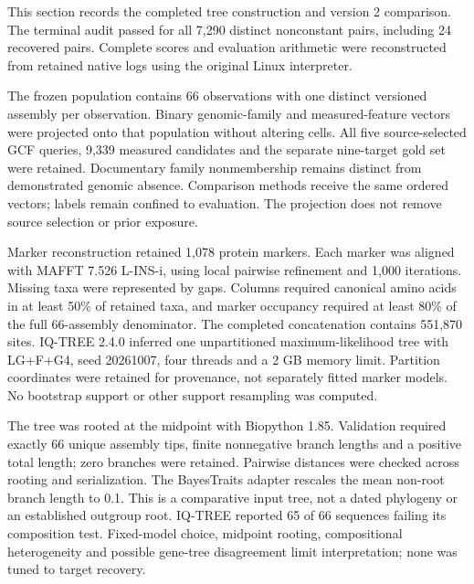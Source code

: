 \documentclass[
  10pt,
  a4paper,
]{article}
\begin{document}
This section records the completed tree construction and version 2 comparison. The terminal audit passed for all 7,290 distinct nonconstant pairs, including 24 recovered pairs. Complete scores and evaluation arithmetic were reconstructed from retained native logs using the original Linux interpreter.

The frozen population contains 66 observations with one distinct versioned assembly per observation. Binary genomic-family and measured-feature vectors were projected onto that population without altering cells. All five source-selected GCF queries, 9,339 measured candidates and the separate nine-target gold set were retained. Documentary family nonmembership remains distinct from demonstrated genomic absence. Comparison methods receive the same ordered vectors; labels remain confined to evaluation. The projection does not remove source selection or prior exposure.

Marker reconstruction retained 1,078 protein markers. Each marker was aligned with MAFFT 7.526 L-INS-i, using local pairwise refinement and 1,000 iterations. Missing taxa were represented by gaps. Columns required canonical amino acids in at least 50\% of retained taxa, and marker occupancy required at least 80\% of the full 66-assembly denominator. The completed concatenation contains 551,870 sites. IQ-TREE 2.4.0 inferred one unpartitioned maximum-likelihood tree with LG+F+G4, seed 20261007, four threads and a 2 GB memory limit. Partition coordinates were retained for provenance, not separately fitted marker models. No bootstrap support or other support resampling was computed.

The tree was rooted at the midpoint with Biopython 1.85. Validation required exactly 66 unique assembly tips, finite nonnegative branch lengths and a positive total length; zero branches were retained. Pairwise distances were checked across rooting and serialization. The BayesTraits adapter rescales the mean non-root branch length to 0.1. This is a comparative input tree, not a dated phylogeny or an established outgroup root. IQ-TREE reported 65 of 66 sequences failing its composition test. Fixed-model choice, midpoint rooting, compositional heterogeneity and possible gene-tree disagreement limit interpretation; none was tuned to target recovery.
\end{document}
